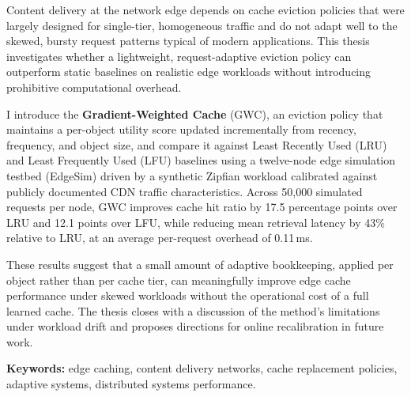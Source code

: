 
Content delivery at the network edge depends on cache eviction policies that were largely
designed for single-tier, homogeneous traffic and do not adapt well to the skewed, bursty
request patterns typical of modern applications. This thesis investigates whether a
lightweight, request-adaptive eviction policy can outperform static baselines on realistic
edge workloads without introducing prohibitive computational overhead.

I introduce the \textbf{Gradient-Weighted Cache} (GWC), an eviction policy that maintains a
per-object utility score updated incrementally from recency, frequency, and object size, and
compare it against Least Recently Used (LRU) and Least Frequently Used (LFU) baselines using
a twelve-node edge simulation testbed (EdgeSim) driven by a synthetic Zipfian workload
calibrated against publicly documented CDN traffic characteristics. Across 50,000 simulated
requests per node, GWC improves cache hit ratio by 17.5 percentage points over LRU and
12.1 points over LFU, while reducing mean retrieval latency by 43\% relative to LRU, at an
average per-request overhead of 0.11\,ms.

These results suggest that a small amount of adaptive bookkeeping, applied per object rather
than per cache tier, can meaningfully improve edge cache performance under skewed workloads
without the operational cost of a full learned cache. The thesis closes with a discussion of
the method's limitations under workload drift and proposes directions for online recalibration
in future work.

\vspace{0.6cm}
\noindent\textbf{Keywords:} edge caching, content delivery networks, cache replacement
policies, adaptive systems, distributed systems performance.
